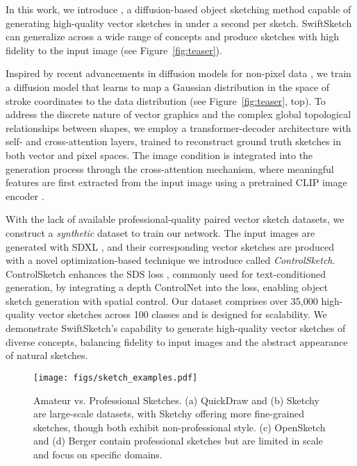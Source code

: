 In this work, we introduce \textit{\methodname}, a diffusion-based object sketching method capable of generating high-quality vector sketches in under a second per sketch. SwiftSketch can generalize across a wide range of concepts and produce sketches with high fidelity to the input image (see Figure~\ref{fig:teaser}).

Inspired by recent advancements in diffusion models for non-pixel data \cite{tevet2023human,Luo2021DiffusionPM,Thamizharasan_2024_CVPR}, we train a diffusion model that learns to map a Gaussian distribution in the space of stroke coordinates to the data distribution (see Figure~\ref{fig:teaser}, top).
To address the discrete nature of vector graphics and the complex global topological relationships between shapes, we employ a transformer-decoder architecture with self- and cross-attention layers, trained to reconstruct ground truth sketches in both vector and pixel spaces.
The image condition is integrated into the generation process through the cross-attention mechanism, where meaningful features are first extracted from the input image using a pretrained CLIP image encoder \cite{Radfordclip}.


With the lack of available professional-quality paired vector sketch datasets, we construct a \emph{synthetic} dataset to train our network.
The input images are generated with SDXL \cite{podell2023sdxlimprovinglatentdiffusion}, and their corresponding vector sketches are produced with a novel optimization-based technique we introduce called \emph{ControlSketch}. 
ControlSketch enhances the SDS loss \cite{Poole2022DreamFusionTU}, commonly used for text-conditioned generation, by integrating a depth ControlNet \cite{controlnet2023} into the loss, enabling object sketch generation with spatial control.
Our dataset comprises over 35,000 high-quality vector sketches across 100 classes and is designed for scalability. 
We demonstrate SwiftSketch's capability to generate high-quality vector sketches of diverse concepts, balancing fidelity to input images and the abstract appearance of natural sketches.























\begin{figure}
    \centering
    \texttt{[image: figs/sketch\_examples.pdf]}
    \vspace{-0.5cm}
    \caption{Amateur vs. Professional Sketches. (a) QuickDraw \cite{SketchRNN} and (b) Sketchy \cite{Sangkloy2016TheSD} are large-scale datasets, with Sketchy offering more fine-grained sketches, though both exhibit non-professional style. (c) OpenSketch \cite{Gryaditskaya2019OpenSketch} and (d) Berger \etal \cite{Berger2013StyleAA} contain professional sketches but are limited in scale and focus on specific domains.}
    \vspace{-0.5cm}
    \label{fig:sketch_data_example}
\end{figure}
